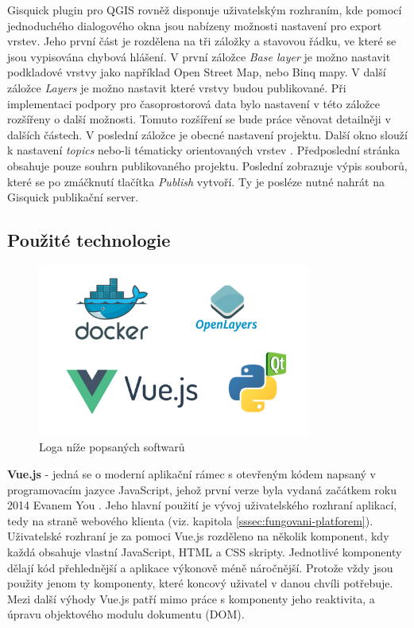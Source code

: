 \newpage
Gisquick plugin pro QGIS rovněž disponuje uživatelským rozhraním, kde
pomocí jednoduchého dialogového okna jsou nabízeny možnosti nastavení
pro export vrstev. Jeho první část je rozdělena na tři záložky a
stavovou řádku, ve které se jsou vypisována chybová hlášení. V
první záložce \textit{Base layer} je možno nastavit podkladové vrstvy
jako například Open Street Map, nebo Binq mapy. V další záložce
\textit{Layers} je možno nastavit které vrstvy budou publikované. Při
implementaci podpory pro časoprostorová data bylo nastavení v této
záložce rozšířeny o další možnosti. Tomuto rozšíření se bude
práce věnovat detailněji v dalších částech. V poslední záložce je
obecné nastavení projektu. Další okno slouží k nastavení \textit{topics}
nebo-li tématicky orientovaných vrstev \cite{gisquick-manual}. Předposlední
stránka obsahuje pouze souhrn publikovaného projektu. Poslední zobrazuje
výpis souborů, které se po zmáčknutí tlačítka \textit{Publish}
vytvoří. Ty je posléze nutné nahrát na Gisquick publikační server.

\newpage
\subsection{Použité technologie}

\begin{figure}[h!]
\centering
\includegraphics[width=0.8\textwidth]{../img/technologies.png}
\caption{Loga níže popsaných softwarů}
\label{fig:technoogies}
\end{figure}

\noindent
\textbf{Vue.js} - jedná se o moderní aplikační rámec s otevřeným kódem
napsaný v programovacím jazyce JavaScript, jehož první verze byla vydaná
začátkem roku 2014 Evanem You \cite{vue-history}. Jeho hlavní použití je
vývoj uživatelského rozhraní aplikací, tedy na straně webového klienta
(viz. kapitola \ref{sssec:fungovani-platforem}). Uživatelské rozhraní
je za pomoci Vue.js rozděleno na několik  komponent, kdy každá obsahuje
vlastní JavaScript, HTML a CSS skripty. Jednotlivé komponenty dělají kód
přehlednější a aplikace výkonově méně náročnější. Protože vždy
jsou použity jenom ty komponenty, které koncový uživatel v danou chvíli
potřebuje. Mezi další výhody Vue.js patří mimo práce s komponenty
jeho reaktivita, a úpravu objektového modulu dokumentu (DOM).

